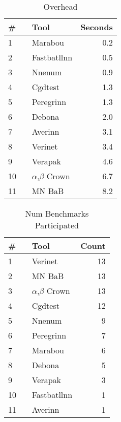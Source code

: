 


\begin{table}[h]
\begin{center}
\caption{Overhead} \label{tab:overhead}
{\setlength{\tabcolsep}{2pt}
\begin{tabular}[h]{@{}llr@{}}
\toprule
\textbf{\# ~} & \textbf{Tool} & \textbf{Seconds}\\
\midrule
1 & Marabou & 0.2 \\
2 & Fastbatllnn & 0.5 \\
3 & Nnenum & 0.9 \\
4 & Cgdtest & 1.3 \\
5 & Peregrinn & 1.3 \\
6 & Debona & 2.0 \\
7 & Averinn & 3.1 \\
8 & Verinet & 3.4 \\
9 & Verapak & 4.6 \\
10 & $\alpha$,$\beta$ Crown & 6.7 \\
11 & MN BaB & 8.2 \\
\bottomrule
\end{tabular}
}
\end{center}
\end{table}




\begin{table}[h]
\begin{center}
\caption{Num Benchmarks Participated} \label{tab:stats0}
{\setlength{\tabcolsep}{2pt}
\begin{tabular}[h]{@{}llr@{}}
\toprule
\textbf{\# ~} & \textbf{Tool} & \textbf{Count}\\
\midrule
1 & Verinet & 13 \\
2 & MN BaB & 13 \\
3 & $\alpha$,$\beta$ Crown & 13 \\
4 & Cgdtest & 12 \\
5 & Nnenum & 9 \\
6 & Peregrinn & 7 \\
7 & Marabou & 6 \\
8 & Debona & 5 \\
9 & Verapak & 3 \\
10 & Fastbatllnn & 1 \\
11 & Averinn & 1 \\
\bottomrule
\end{tabular}
}
\end{center}
\end{table}



